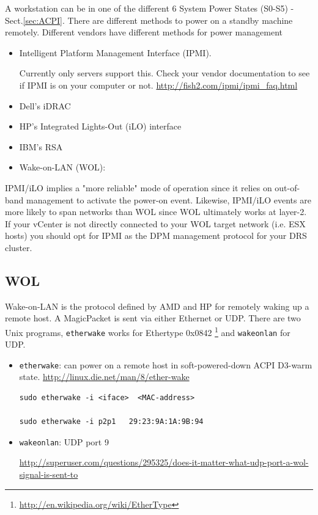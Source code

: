 A workstation can be in one of the different 6 System Power States (S0-S5) -
Sect.\ref{sec:ACPI}. There are different methods to power on a standby machine
remotely. Different vendors have different methods for power management
\begin{itemize}
  \item  Intelligent Platform Management Interface (IPMI). 
  
  Currently only servers support this. Check your vendor documentation to see
  if IPMI is on your computer or not. \url{http://fish2.com/ipmi/ipmi_faq.html}
  
  \item Dell's iDRAC
  
  \item HP's Integrated Lights-Out (iLO) interface  
  
  \item IBM's RSA
  
  \item Wake-on-LAN (WOL): 
\end{itemize}


IPMI/iLO implies a "more reliable" mode of operation since it relies on
out-of-band management to activate the power-on event. Likewise, IPMI/iLO events
are more likely to span networks than WOL since WOL ultimately works at layer-2.
 If your vCenter is not directly connected to your WOL target network (i.e. ESX
hosts) you should opt for IPMI as the DPM management protocol for your DRS cluster.


\subsection{WOL}
\label{sec:Wake-on-Lan}

Wake-on-LAN is the protocol defined by AMD and HP for remotely
waking up a remote host. A MagicPacket is sent via either Ethernet
or UDP. There are two Unix programs, \verb!etherwake! works for Ethertype
0x0842 \footnote{\url{http://en.wikipedia.org/wiki/EtherType}} and
\verb!wakeonlan! for UDP.
\begin{itemize}
    \item \verb!etherwake!: can power on a remote host in soft-powered-down ACPI
    D3-warm state. \url{http://linux.die.net/man/8/ether-wake}
\begin{verbatim}
sudo etherwake -i <iface>  <MAC-address>

sudo etherwake -i p2p1   29:23:9A:1A:9B:94
\end{verbatim}
    
    \item \verb!wakeonlan!: UDP port 9
    
    \url{http://superuser.com/questions/295325/does-it-matter-what-udp-port-a-wol-signal-is-sent-to}
\end{itemize}  

